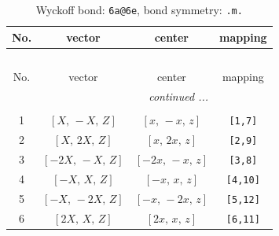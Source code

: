 \documentclass[fleqn,8pt]{jsarticle}
\begin{document}
\begin{longtable}{cccc}
\caption{Wyckoff bond: {\tt 6a@6e}, bond symmetry: {\tt .m.}}
 \\
 \hline \hline
No. & vector & center & mapping \\ \hline \endfirsthead

\multicolumn{3}{l}{\tablename\ \thetable{}} \\
 \hline \hline
No. & vector & center & mapping \\ \hline \endhead

 \hline \hline
\multicolumn{3}{r}{\footnotesize\it continued ...} \\ \endfoot

 \hline \hline
\multicolumn{3}{r}{} \\ \endlastfoot

1 & $\left[ X,\, - X,\, Z \right]$ & $\left[ x,\, - x,\, z \right]$ & {\tt [1,7]} \\ \hline
2 & $\left[ X,\, 2 X,\, Z \right]$ & $\left[ x,\, 2 x,\, z \right]$ & {\tt [2,9]} \\ \hline
3 & $\left[ - 2 X,\, - X,\, Z \right]$ & $\left[ - 2 x,\, - x,\, z \right]$ & {\tt [3,8]} \\ \hline
4 & $\left[ - X,\, X,\, Z \right]$ & $\left[ - x,\, x,\, z \right]$ & {\tt [4,10]} \\ \hline
5 & $\left[ - X,\, - 2 X,\, Z \right]$ & $\left[ - x,\, - 2 x,\, z \right]$ & {\tt [5,12]} \\ \hline
6 & $\left[ 2 X,\, X,\, Z \right]$ & $\left[ 2 x,\, x,\, z \right]$ & {\tt [6,11]} \\
\end{longtable}
\renewcommand{\arraystretch}{1.2}
\end{document}
